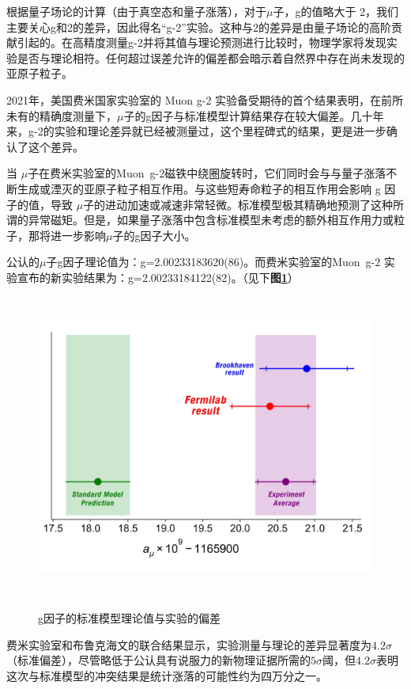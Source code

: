根据量子场论的计算（由于真空态和量子涨落），对于$\mu$子，g的值略大于 2，我们主要关心g和2的差异，因此得名“g-2”实验。这种与2的差异是由量子场论的高阶贡献引起的。在高精度测量g-2并将其值与理论预测进行比较时，物理学家将发现实验是否与理论相符。任何超过误差允许的偏差都会暗示着自然界中存在尚未发现的亚原子粒子。

2021年，美国费米国家实验室的 Muon g-2 实验备受期待的首个结果表明，在前所未有的精确度测量下，$\mu$子的g因子与标准模型计算结果存在较大偏差。几十年来，g-2的实验和理论差异就已经被测量过，这个里程碑式的结果，更是进一步确认了这个差异。

当 $\mu$子在费米实验室的Muon\ g-2磁铁中绕圈旋转时，它们同时会与与量子涨落不断生成或湮灭的亚原子粒子相互作用。与这些短寿命粒子的相互作用会影响 g 因子的值，导致 $\mu$子的进动加速或减速非常轻微。标准模型极其精确地预测了这种所谓的异常磁矩。但是，如果量子涨落中包含标准模型未考虑的额外相互作用力或粒子，那将进一步影响$\mu$子的g因子大小。

公认的$\mu$子g因子理论值为：g=2.00233183620(86)。而费米实验室的Muon\ g-2 实验宣布的新实验结果为：g=2.00233184122(82)。（见下\textbf{图\ref{fig:1.2}}）
\begin{figure}[H]
 \centering
 \caption{g因子的标准模型理论值与实验的偏差}
 \includegraphics[height=10cm, width=12cm]{pictures/Muon-g-2-results-plot.jpeg}
 \label{fig:1.2}
\end{figure}

费米实验室和布鲁克海文的联合结果显示，实验测量与理论的差异显著度为$4.2\sigma$（标准偏差），尽管略低于公认具有说服力的新物理证据所需的$5\sigma$阈，但$4.2\sigma$表明这次与标准模型的冲突结果是统计涨落的可能性约为四万分之一。

